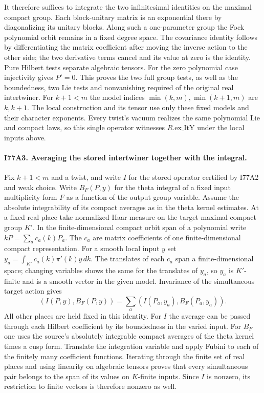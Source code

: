 It therefore suffices to integrate the two infinitesimal identities
on the maximal compact group. Each block-unitary matrix is an
exponential there by diagonalizing its unitary blocks. Along such
a one-parameter group the Fock polynomial orbit remains in a fixed
degree space. The covariance identity follows by differentiating the
matrix coefficient after moving the inverse action to the other side;
the two derivative terms cancel and its value at zero is the
identity. Pure Hilbert tests separate algebraic tensors. For the
zero polynomial case injectivity gives $P'=0$. This proves the two
full group tests, as well as the boundedness, two Lie tests and
nonvanishing required of the original real intertwiner. For
$k+1<m$ the model indices $\min(k,m),\min(k+1,m)$ are $k,k+1$.
The local construction and its tensor use only these fixed models and
their character exponents. Every twist's vacuum realizes the same
polynomial Lie and compact laws, so this single operator witnesses
$R.\mathrm{ex\_ItY}$ under the local inputs above.

\paragraph{I77A3. Averaging the stored intertwiner together with the integral.}
Fix $k+1<m$ and a twist, and write $I$ for the stored operator certified
by I77A2 and weak choice. Write $B_F(P,y)$ for the theta integral
of a fixed input multiplicity form $F$ as a function of the output
group variable. Assume the absolute integrability of its compact
averages as in the theta kernel estimates. At a fixed real place take
normalized Haar measure on the target maximal compact group $K'$.
In the finite-dimensional compact orbit span of a polynomial write
$kP=\sum_a c_a(k)P_a$. The $c_a$ are matrix coefficients of one
finite-dimensional compact representation. For a smooth local input
$y$ set $y_a=\int_{K'} c_a(k)\pi'(k)y\,dk$.
The translates of each $c_a$ span a finite-dimensional space; changing
variables shows the same for the translates of $y_a$, so $y_a$ is
$K'$-finite and is a smooth vector in the given model. Invariance
of the simultaneous target action gives
\[
       (I(P,y),B_F(P,y))=\sum_a (I(P_a,y_a),B_F(P_a,y_a)).
\]
All other places are held fixed in this identity. For $I$ the
average can be passed through each Hilbert coefficient by its boundedness
in the varied input. For $B_F$ one uses the source's absolutely
integrable compact averages of the theta kernel times a cusp form.
Translate the integration variable and apply Fubini to each of the
finitely many coefficient functions. Iterating through the finite
set of real places and using linearity on algebraic tensors proves
that every simultaneous pair belongs to the span of its values on
$K$-finite inputs. Since $I$ is nonzero,
its restriction to finite vectors is therefore nonzero as well.

